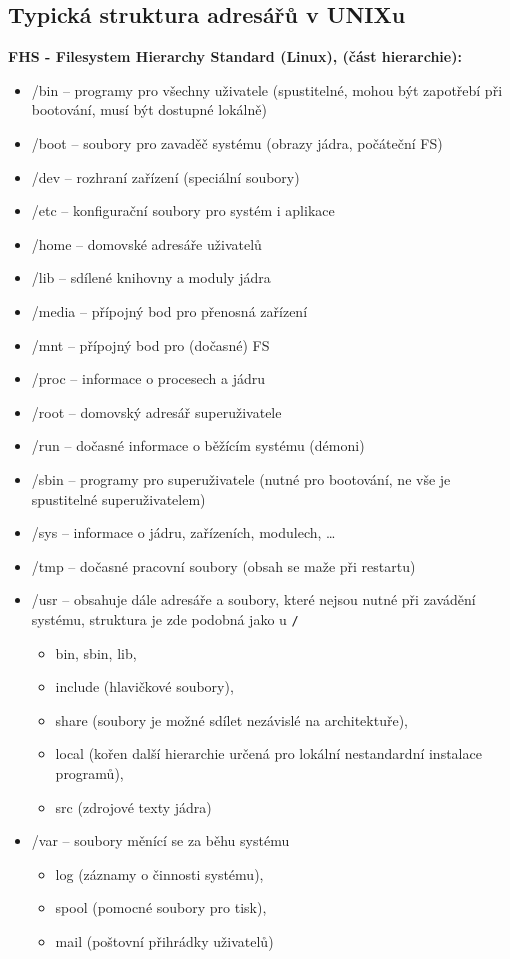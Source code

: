 \documentclass[a4paper, 11pt]{article}
\newcommand{\tcmd}[1]{\texttt{#1}}
\begin{document}
\subsection{Typická struktura adresářů v UNIXu}
\textbf{FHS - Filesystem Hierarchy Standard (Linux), (část hierarchie):}
\begin{itemize}
    \item /bin -- programy pro všechny uživatele (spustitelné, mohou být zapotřebí při bootování, musí být dostupné lokálně)
    \item /boot -- soubory pro zavaděč systému (obrazy jádra, počáteční FS)
    \item /dev -- rozhraní zařízení (speciální soubory)
    \item /etc -- konfigurační soubory pro systém i aplikace
    \item /home -- domovské adresáře uživatelů
    \item /lib -- sdílené knihovny a moduly jádra
    \item /media -- přípojný bod pro přenosná zařízení
    \item /mnt -- přípojný bod pro (dočasné) FS
    \item /proc -- informace o procesech a jádru
    \item /root -- domovský adresář superuživatele
    \item /run -- dočasné informace o běžícím systému (démoni)
    \item /sbin -- programy pro superuživatele (nutné pro bootování, ne vše je spustitelné superuživatelem)
    \item /sys -- informace o jádru, zařízeních, modulech, \ldots
    \item /tmp -- dočasné pracovní soubory (obsah se maže při restartu)
    \item /usr -- obsahuje dále adresáře a soubory, které nejsou nutné při zavádění systému, struktura je zde podobná jako u \tcmd{/}
    \begin{itemize}
        \item bin, sbin, lib,
        \item include (hlavičkové soubory),
        \item share (soubory je možné sdílet nezávislé na architektuře),
        \item local (kořen další hierarchie určená pro lokální nestandardní instalace programů),
        \item src (zdrojové texty jádra)
    \end{itemize}
    \item /var -- soubory měnící se za běhu systému
    \begin{itemize}
        \item log (záznamy o činnosti systému), 
        \item spool (pomocné soubory pro tisk),
        \item mail (poštovní přihrádky uživatelů)
    \end{itemize}
\end{itemize}
\end{document}
